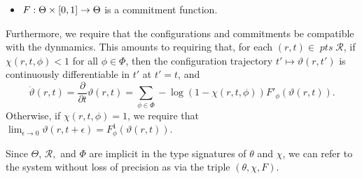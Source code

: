 \documentclass{article}
\newcommand\pts{\mathop{\mathit{pts}}}
\begin{document}
\begin{defn}
\begin{itemize}[]
            \item $F : \Theta \time \Phi \times [0,1] \to \Theta$ is a commitment function.
        \end{itemize}
        Furthermore, we require that the configurations and commitments be compatible with the dynmamics.
        This amounts to requiring that,
        for each $(r,t) \in \pts \mathcal R$, 
            if $\chi(r,t,\phi) < 1$ for all $\phi \in \Phi$, then
        the configuration trajectory $t' \mapsto \vartheta(r,t')$ is continuously differentiable in $t'$ at $t'=t$, and
        \[
            \dot\vartheta(r,t) = \frac{\partial}{\partial t} \vartheta(r, t) = 
                \sum_{\phi \in \Phi} -\log (1 - \chi(r,t,\phi)) F'_\phi(\vartheta(r,t)).
        \]
        Otherwise, if $\chi(r,t,\phi) = 1$, we require that
        $\displaystyle
            \lim_{\epsilon \to 0} \vartheta(r,t+\epsilon) = 
                F^1_\phi(\vartheta(r,t))
        $.
        
        Since $\Theta$, $\mathcal R,$ and $\Phi$ are implicit in the type signatures of $\theta$ and $\chi$, we can refer to the system without loss of precision as via the triple $(\theta, \chi, F)$. 
    \end{defn}
    
\end{document}
